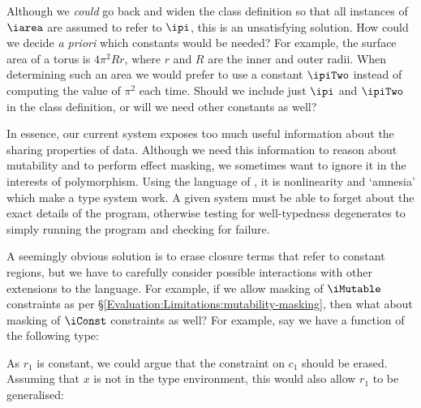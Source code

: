 
Although we \emph{could} go back and widen the class definition so that all instances of $\iarea$ are assumed to refer to $\ipi$, this is an unsatisfying solution. How could we decide \emph{a priori} which constants would be needed? For example, the surface area of a torus is $4 \pi^2Rr$, where $r$ and $R$ are the inner and outer radii. When determining such an area we would prefer to use a constant $\ipiTwo$ instead of computing the value of $\pi^2$ each time. Should we include just $\ipi$ and $\ipiTwo$ in the class definition, or will we need other constants as well?

In essence, our current system exposes too much useful information about the sharing properties of data. Although we need this information to reason about mutability and to perform effect masking, we sometimes want to ignore it in the interests of polymorphism. Using the language of \cite{neergaard:nonlinearity-and-amnesia}, it is nonlinearity and `amnesia' which make a type system work. A given system must be able to forget about the exact details of the program, otherwise testing for well-typedness degenerates to simply running the program and checking for failure.

A seemingly obvious solution is to erase closure terms that refer to constant regions, but we have to carefully consider possible interactions with other extensions to the language. For example, if we allow masking of $\iMutable$ constraints as per \S\ref{Evaluation:Limitations:mutability-masking}, then what about masking of $\iConst$ constraints as well? For example, say we have a function of the following type:


As $r_1$ is constant, we could argue that the constraint on $c_1$ should be erased. Assuming that $x$ is not in the type environment, this would also allow $r_1$ to be generalised:


